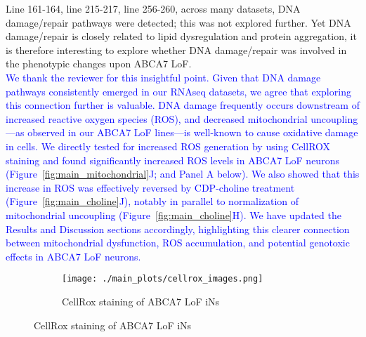 Line 161-164, line 215-217, line 256-260, across many datasets, DNA damage/repair pathways were detected; this was not explored further. Yet DNA damage/repair is closely related to lipid dysregulation and protein aggregation, it is therefore interesting to explore whether DNA damage/repair was involved in the phenotypic changes upon ABCA7 LoF.\\
\textcolor{blue}{We thank the reviewer for this insightful point. Given that DNA damage pathways consistently emerged in our RNAseq datasets, we agree that exploring this connection further is valuable. DNA damage frequently occurs downstream of increased reactive oxygen species (ROS)\cite{Welch2022-bp}, and decreased mitochondrial uncoupling—as observed in our ABCA7 LoF lines—is well-known to cause oxidative damage in cells\cite{Jain2024-br, Crivelli2024-pf}. We directly tested for increased ROS generation by using CellROX staining and found significantly increased ROS levels in ABCA7 LoF neurons (Figure~\ref{fig:main_mitochondrial}J; and Panel A below). We also showed that this increase in ROS was effectively reversed by CDP-choline treatment (Figure~\ref{fig:main_choline}J), notably in parallel to normalization of mitochondrial uncoupling (Figure~\ref{fig:main_choline}H). We have updated the Results and Discussion sections accordingly, highlighting this clearer connection between mitochondrial dysfunction, ROS accumulation, and potential genotoxic effects in ABCA7 LoF neurons.}

\begin{figure}[H] 
	\centering
	\begin{subfigure}[t]{.7\textwidth}
		\caption{CellRox staining of ABCA7 LoF iNs}
		\texttt{[image: ./main\_plots/cellrox\_images.png]}        
	\end{subfigure}  
\end{figure}